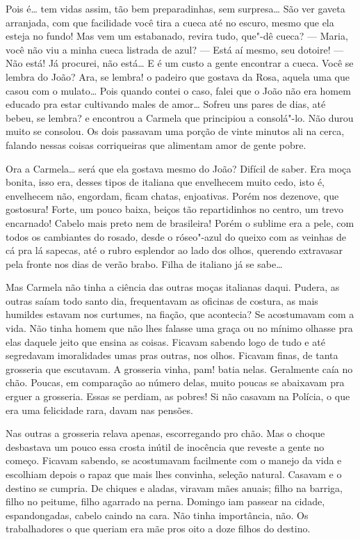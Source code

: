 Pois é\ldots{} tem vidas assim, tão bem preparadinhas, sem surpresa\ldots{} São
ver gaveta arranjada, com que facilidade você tira a cueca até no
escuro, mesmo que ela esteja no fundo! Mas vem um estabanado, revira
tudo, que"-dê cueca? --- Maria, você não viu a minha cueca listrada de
azul? --- Está aí mesmo, seu dotoire! --- Não está! Já procurei, não
está\ldots{} E é um custo a gente encontrar a cueca. Você se lembra do João?
Ara, se lembra! o padeiro que gostava da Rosa, aquela uma que casou com
o mulato\ldots{} Pois quando contei o caso, falei que o João não era homem
educado pra estar cultivando males de amor\ldots{} Sofreu uns pares de dias,
até bebeu, se lembra? e encontrou a Carmela que principiou a consolá"-lo.
Não durou muito se consolou. Os dois passavam uma porção de vinte
minutos ali na cerca, falando nessas coisas corriqueiras que alimentam
amor de gente pobre.

Ora a Carmela\ldots{} será que ela gostava mesmo do João? Difícil de saber.
Era moça bonita, isso era, desses tipos de italiana que envelhecem muito
cedo, isto é, envelhecem não, engordam, ficam chatas, enjoativas. Porém
nos dezenove, que gostosura! Forte, um pouco baixa, beiços tão
repartidinhos no centro, um trevo encarnado! Cabelo mais preto nem de
brasileira! Porém o sublime era a pele, com todos os cambiantes do
rosado, desde o róseo"-azul do queixo com as veinhas de cá pra lá
sapecas, até o rubro esplendor ao lado dos olhos, querendo extravasar
pela fronte nos dias de verão brabo. Filha de italiano já se sabe\ldots{}

Mas Carmela não tinha a ciência das outras moças italianas daqui.
Pudera, as outras saíam todo santo dia, frequentavam as oficinas de
costura, as mais humildes estavam nos curtumes, na fiação, que
acontecia? Se acostumavam com a vida. Não tinha homem que não lhes
falasse uma graça ou no mínimo olhasse pra elas daquele jeito que ensina
as coisas. Ficavam sabendo logo de tudo e até segredavam imoralidades
umas pras outras, nos olhos. Ficavam finas, de tanta grosseria que
escutavam. A grosseria vinha, pam! batia nelas. Geralmente caía no chão.
Poucas, em comparação ao número delas, muito poucas se abaixavam pra
erguer a grosseria. Essas se perdiam, as pobres! Si não casavam na
Polícia, o que era uma felicidade rara, davam nas pensões.

Nas outras a grosseria relava apenas, escorregando pro chão. Mas o
choque desbastava um pouco essa crosta inútil de inocência que reveste a
gente no começo. Ficavam sabendo, se acostumavam facilmente com o manejo
da vida e escolhiam depois o rapaz que mais lhes convinha, seleção
natural. Casavam e o destino se cumpria. De chiques e aladas, viravam
mães anuais; filho na barriga, filho no peitume, filho agarrado na
perna. Domingo iam passear na cidade, espandongadas, cabelo caindo na
cara. Não tinha importância, não. Os trabalhadores o que queriam era mãe
pros oito a doze filhos do destino.

